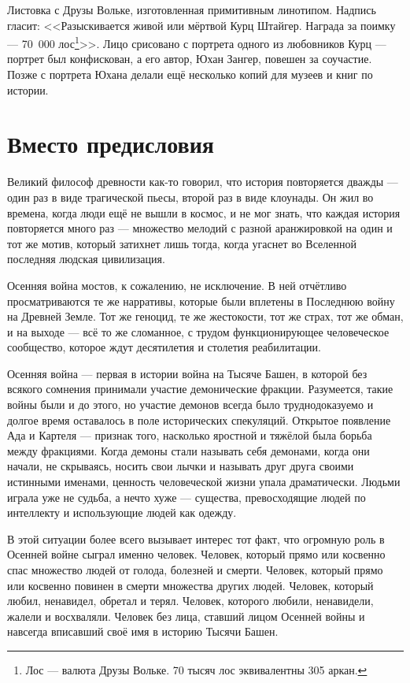 Листовка с Друзы Вольке, изготовленная примитивным линотипом.
Надпись гласит:
<<Разыскивается живой или мёртвой Курц Штайгер.
Награда за поимку --- 70~000 лос\footnote{Лос --- валюта Друзы Вольке. 70 тысяч лос эквивалентны 305 аркан.}>>.
Лицо срисовано с портрета одного из любовников Курц --- портрет был конфискован, а его автор, Юхан Зангер, повешен за соучастие.
Позже с портрета Юхана делали ещё несколько копий для музеев и книг по истории.

\newpage
\pagestyle{fancy}

\section{Вместо предисловия}

Великий философ древности как-то говорил, что история повторяется дважды --- один раз в виде трагической пьесы, второй раз в виде клоунады.
Он жил во времена, когда люди ещё не вышли в космос, и не мог знать, что каждая история повторяется много раз --- множество мелодий с разной аранжировкой на один и тот же мотив, который затихнет лишь тогда, когда угаснет во Вселенной последняя людская цивилизация.

Осенняя война мостов, к сожалению, не исключение.
В ней отчётливо просматриваются те же нарративы, которые были вплетены в Последнюю войну на Древней Земле.
Тот же геноцид, те же жестокости, тот же страх, тот же обман, и на выходе --- всё то же сломанное, с трудом функционирующее человеческое сообщество, которое ждут десятилетия и столетия реабилитации.

Осенняя война --- первая в истории война на Тысяче Башен, в которой без всякого сомнения принимали участие демонические фракции.
Разумеется, такие войны были и до этого, но участие демонов всегда было труднодоказуемо и долгое время оставалось в поле исторических спекуляций.
Открытое появление Ада и Картеля --- признак того, насколько яростной и тяжёлой была борьба между фракциями.
Когда демоны стали называть себя демонами, когда они начали, не скрываясь, носить свои лычки и называть друг друга своими истинными именами, ценность человеческой жизни упала драматически.
Людьми играла уже не судьба, а нечто хуже --- существа, превосходящие людей по интеллекту и использующие людей как одежду.

В этой ситуации более всего вызывает интерес тот факт, что огромную роль в Осенней войне сыграл именно человек.
Человек, который прямо или косвенно спас множество людей от голода, болезней и смерти.
Человек, который прямо или косвенно повинен в смерти множества других людей.
Человек, который любил, ненавидел, обретал и терял.
Человек, которого любили, ненавидели, жалели и восхваляли.
Человек без лица, ставший лицом Осенней войны и навсегда вписавший своё имя в историю Тысячи Башен.

